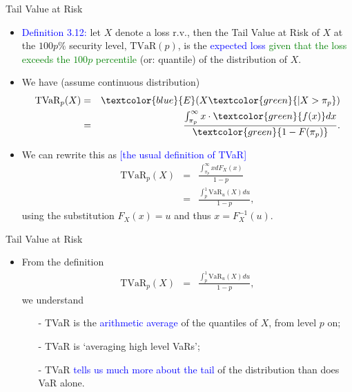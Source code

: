 \documentclass{beamer}
\begin{document}
\begin{frame}{Tail Value at Risk}
\begin{itemize}
\item \textcolor{blue}{Definition 3.12:} let $X$ denote a loss r.v., then the Tail Value at Risk of $X$ at the $100p\%$ security level, $\text{TVaR}(p)$, is the \textcolor{blue}{expected loss} \textcolor{green}{given that the loss exceeds the $100p$ percentile} (or: quantile) of the distribution of $X$.
\vspace{0.3cm}
\item We have (assume continuous distribution)
\begin{eqnarray*}
\text{TVaR}_p(X) &=& \textcolor{blue}{E}(X\textcolor{green}{|X>\pi_p}) \\
&=& \frac{\int_{\pi_p}^{\infty} x\cdot \textcolor{green}{f(x)} dx}{\textcolor{green}{1-F(\pi_p)}}.
\end{eqnarray*}
\item We can rewrite this as \quad \textcolor{blue}{[the usual definition of TVaR]}
\begin{eqnarray*}
\text{TVaR}_p(X) &=& \frac{\int_{\pi_p}^{\infty} x dF_X(x)}{1-p} \\
&=& \frac{\int_p^1 \text{VaR}_u(X) du}{1-p},
\end{eqnarray*}
using the substitution $F_X(x) = u$ and thus $x=F_X^{-1}(u)$.
\end{itemize}
\end{frame}

\begin{frame}{Tail Value at Risk}
\begin{itemize}
\item From the definition
\begin{eqnarray*}
\text{TVaR}_p(X) &=& \frac{\int_p^1 \text{VaR}_u(X) du}{1-p},
\end{eqnarray*}
we understand
\vspace{0.3cm}
\begin{itemize}
\item[-] TVaR is the \textcolor{blue}{arithmetic average} of the quantiles of $X$, from level $p$ on;
\vspace{0.3cm}
\item[-] TVaR is `averaging high level VaRs';
\vspace{0.3cm}
\item[-] TVaR \textcolor{blue}{tells us much more about the tail} of the distribution than does VaR alone.
\end{itemize}
\end{itemize}
\end{frame}
\end{document}
